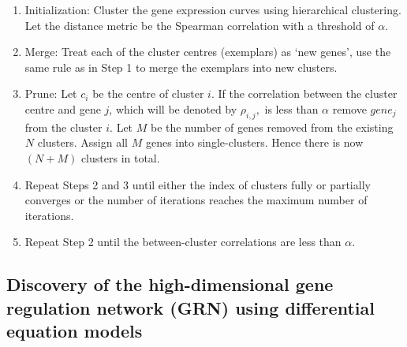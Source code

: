 \begin{enumerate}
   \item Initialization: Cluster the gene expression curves using hierarchical clustering. Let the distance metric be the Spearman correlation with a threshold of $\alpha$.
   \item Merge: Treat each of the cluster centres (exemplars) as `new genes', use the same rule as in Step 1 to merge the exemplars into new clusters.
   \item Prune: Let $c_{i}$ be the centre of cluster $i$. If the correlation between the cluster centre and gene $j$, which will be denoted by $\rho_{i,j},$ is less than $\alpha$ remove $gene_{j}$ from the cluster $i$. Let $M$ be the number of genes removed from the existing $N$ clusters. Assign all $M$ genes into single-clusters. Hence there is now $(N+M)$ clusters in total.
   \item Repeat Steps 2 and 3 until either the index of clusters fully or partially converges or the number of iterations reaches the maximum number of iterations.
   \item Repeat Step 2 until the between-cluster correlations are less than $\alpha$.
\end{enumerate}

\subsection{Discovery of the high-dimensional gene regulation network (GRN) using differential equation models}
\label{section:identification_of_grn}

